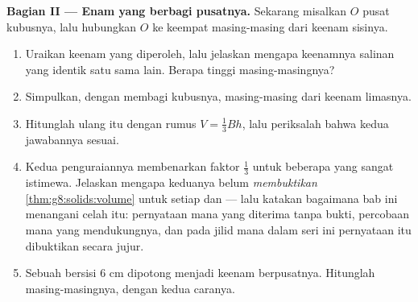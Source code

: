 \begin{problem}
\medskip
\noindent\textbf{Bagian II --- Enam  yang berbagi pusatnya.}
Sekarang misalkan $O$ pusat kubusnya, lalu hubungkan $O$ ke keempat
 masing-masing dari keenam sisinya.
\begin{enumerate}[resume]
  \item Uraikan keenam  yang diperoleh, lalu jelaskan mengapa
        keenamnya salinan yang identik satu sama lain. Berapa
        tinggi masing-masingnya?
  \item Simpulkan, dengan membagi  kubusnya, 
        masing-masing dari keenam limasnya.
  \item Hitunglah ulang  itu dengan rumus
        $V = \frac13 B h$, lalu periksalah bahwa kedua jawabannya sesuai.
  \item Kedua penguraiannya membenarkan faktor $\frac13$ untuk
        beberapa  yang sangat istimewa. Jelaskan mengapa
        keduanya belum \emph{membuktikan} \cref{thm:g8:solids:volume}
        untuk setiap  dan  --- lalu katakan bagaimana
        bab ini menangani celah itu: pernyataan mana yang diterima
        tanpa bukti, percobaan mana yang mendukungnya, dan pada
        jilid mana dalam seri ini pernyataan itu dibuktikan secara
        jujur.
  \item Sebuah  bersisi $6$ cm dipotong menjadi keenam 
        berpusatnya. Hitunglah  masing-masingnya, dengan kedua caranya.
\end{enumerate}


\end{problem}
